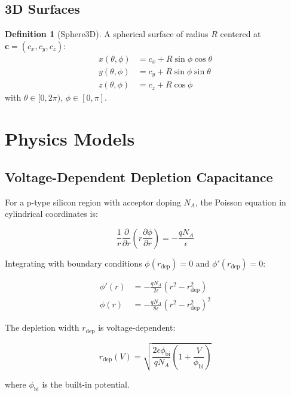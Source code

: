 \documentclass[12pt]{article}
\theoremstyle{definition}
\newtheorem{definition}{Definition}
\begin{document}
\subsection{3D Surfaces}

\begin{definition}[Sphere3D]
A spherical surface of radius $R$ centered at $\mathbf{c} = (c_x, c_y, c_z)$:
\begin{align}
x(\theta, \phi) &= c_x + R \sin \phi \cos \theta \\
y(\theta, \phi) &= c_y + R \sin \phi \sin \theta \\
z(\theta, \phi) &= c_z + R \cos \phi
\end{align}
with $\theta \in [0, 2\pi)$, $\phi \in [0, \pi]$.
\end{definition}

\section{Physics Models}

\subsection{Voltage-Dependent Depletion Capacitance}

For a p-type silicon region with acceptor doping $N_A$, the Poisson equation in cylindrical coordinates is:

\begin{equation}
\frac{1}{r} \frac{\partial}{\partial r} \left(r \frac{\partial \phi}{\partial r}\right) = -\frac{q N_A}{\epsilon}
\end{equation}

Integrating with boundary conditions $\phi(r_{\text{dep}}) = 0$ and $\phi'(r_{\text{dep}}) = 0$:

\begin{align}
\phi'(r) &= -\frac{q N_A}{2 \epsilon} (r^2 - r_{\text{dep}}^2) \\
\phi(r) &= -\frac{q N_A}{8 \epsilon} (r^2 - r_{\text{dep}}^2)^2
\end{align}

The depletion width $r_{\text{dep}}$ is voltage-dependent:

\begin{equation}
r_{\text{dep}}(V) = \sqrt{\frac{2 \epsilon \phi_{\text{bi}}}{q N_A} \left(1 + \frac{V}{\phi_{\text{bi}}}\right)}
\end{equation}

where $\phi_{\text{bi}}$ is the built-in potential.
\end{document}
